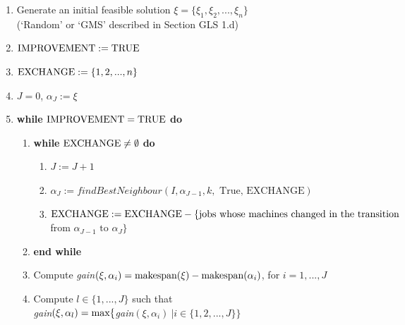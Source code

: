 \documentclass[12pt,a4paper,reqno]{article}
\begin{document}
\begin{enumerate}
\item Generate an initial feasible solution $\xi = \{\xi_1,\xi_2,...,\xi_n\}$ \\ (`Random' or `GMS' described in Section GLS 1.d)
\item $\textnormal{IMPROVEMENT} := \textnormal{TRUE}$
\item[] $\textnormal{EXCHANGE} := \{1,2,...,n\}$
\item[] $J=0$, $\alpha_J := \xi$
\item \textbf{while} $\textnormal{IMPROVEMENT} = \textnormal{TRUE}$ \textbf{do}
\begin{enumerate}
\item \textbf{while} $\textnormal{EXCHANGE} \neq \emptyset$ \textbf{do}
\begin{enumerate}
\item $J := J+1$
\item $\alpha_J := findBestNeighbour(I,\alpha_{J-1},k,\text{ True, EXCHANGE})$
\item $\textnormal{EXCHANGE} := \textnormal{EXCHANGE} - \{\text{jobs whose machines changed in the transition}$\\
\hspace*{6cm} from $\alpha_{J-1} \text{ to } \alpha_{J}\} $
\end{enumerate}
\item[] \textbf{end while}
\item Compute \textit{gain}$(\xi,\alpha_i) = \textnormal{makespan}(\xi) - \textnormal{makespan}(\alpha_i)$, for $i=1,...,J$
\item Compute $l \in \{1,...,J\}$ such that \\ \textit{gain}$(\xi,\alpha_l) = \textnormal{max}\{$\textit{gain}$(\xi,\alpha_i) \> | i \in \{1,2,...,J\} \}$

\end{enumerate}
\end{enumerate}
\end{document}
